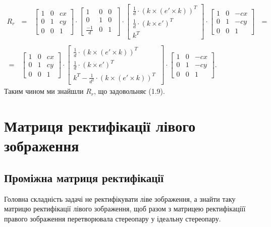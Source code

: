 \begin{equation}
\begin{array}{l}
R_r  \:\:\: = \:\:\:
\left[
\begin{matrix}
1 & 0 & cx\\
0 & 1 & cy\\
0 & 0 & 1\
\end{matrix}
\right]
\cdot
\left[
\begin{matrix}
1 & 0 & 0\\
0 & 1 & 0\\
\frac{-1}{d} & 0 & 1\
\end{matrix}
\right]
\cdot
\left[
\begin{matrix}
\frac{1}{d} \cdot {(k \times (e' \times k))}^T\\
\frac{1}{d} \cdot {(k \times e')}^T\\
k^T\
\end{matrix}
\right]
\cdot
\left[
\begin{matrix}
1 & 0 & -cx\\
0 & 1 & -cy\\
0 & 0 & 1\
\end{matrix}
\right] \:\:\: =
\\\\
= \:\:\:
\left[
\begin{matrix}
1 & 0 & cx\\
0 & 1 & cy\\
0 & 0 & 1\
\end{matrix}
\right]
\cdot
\left[
\begin{matrix}
\frac{1}{d} \cdot {(k \times (e' \times k))}^T\\
\frac{1}{d} \cdot {(k \times e')}^T\\
k^T - \frac{1}{d^2} \cdot {(k \times (e' \times k))}^T\
\end{matrix}
\right]
\cdot
\left[
\begin{matrix}
1 & 0 & -cx\\
0 & 1 & -cy\\
0 & 0 & 1\
\end{matrix}
\right].
\end{array}
\end{equation}
Таким чином ми знайшли $R_r$, що задовольняє (1.9).



\section{Матриця ректифікації лівого зображення}
\subsection{Проміжна матриця ректифікації}
Головна складність задачі не ректифікувати ліве зображення, а знайти таку 
матрицю ректифікації лівого зображення, щоб разом з матрицею ректифікаціїї
правого зображення перетворювала стереопару у ідеальну стереопару.

